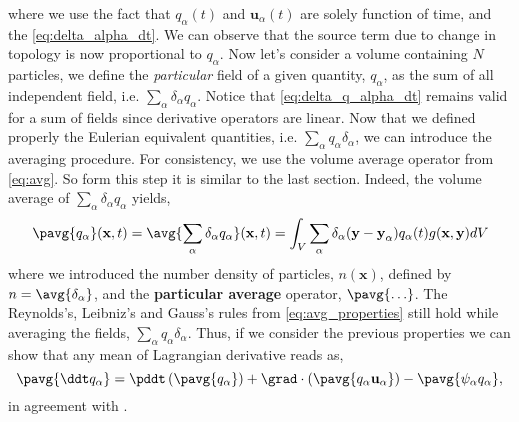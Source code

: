 where we use the fact that $q_\alpha(t)$ and $\textbf{u}_\alpha(t)$ are solely function of time, and the \ref{eq:delta_alpha_dt}.
We can observe that the source term due to change in topology is now proportional to $q_\alpha$. 
Now let's consider a volume containing $N$ particles, we define the \textit{particular} field of a given quantity, $q_\alpha$, as the sum of all independent field, i.e. $\sum_\alpha \delta_\alpha q_\alpha$.
Notice that \ref{eq:delta_q_alpha_dt} remains valid for a sum of fields since derivative operators are linear.  
Now that we defined properly the Eulerian equivalent quantities, i.e. $\sum_\alpha q_\alpha \delta_\alpha$, we can introduce the averaging procedure. 
For consistency, we use the volume average operator from \ref{eq:avg}.
So form this step it is similar to the last section. 
Indeed, the volume average of $\sum_\alpha \delta_\alpha q_\alpha$ yields, 
\begin{equation*}
    \pavg{q_\alpha}(\textbf{x},t)
    = \avg{\sum_\alpha\delta_\alpha q_\alpha} (\textbf{x},t)
    = \int_V 
    \sum_\alpha \delta_\alpha(\textbf{y}- \textbf{y}_\alpha) q_\alpha(t)  
    g(\textbf{x},\textbf{y}) 
    dV
    \label{eq:avg_p}
\end{equation*}
where we introduced the number density of particles, $n(\textbf{x})$, defined by $n = \avg{\delta_\alpha}$, and the \textbf{particular average} operator, $\pavg{\ldots}$.  
The Reynolds’s, Leibniz's and Gauss's rules from \ref{eq:avg_properties} still hold while averaging the fields, $\sum_\alpha q_\alpha \delta_\alpha$.
Thus, if we consider the previous properties we can show that any mean of Lagrangian derivative reads as, 
\begin{equation}
    \pavg{\ddt q_\alpha}
    = \pddt \left(\pavg{q_\alpha}\right)
    + \grad \cdot \left(\pavg{q_\alpha \textbf{u}_\alpha}\right)
    - \pavg{\psi_\alpha q_\alpha}
    ,\label{eq:q_alpha_dt_avg}
\end{equation}
in agreement with \citep{anderson1967fluid}.

